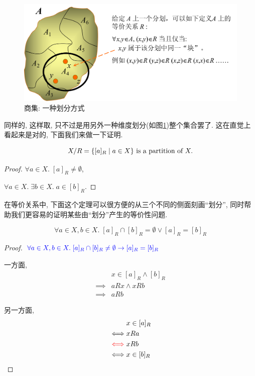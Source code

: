 \begin{figure}
	\centering
	\includegraphics[scale=0.6]{3-set-theory/figs/quot-set}
	\caption{商集: 一种划分方式}
	\label{figs:qset}
\end{figure}

同样的, 这样取, 只不过是用另外一种维度划分(如图\ref{figs:qset})整个集合罢了. 这在直觉上看起来是对的, 下面我们来做一下证明. 

\begin{theorem}
  \[
    X/R = \{[a]_{R} \mid a \in X\} \text{ is a partition of } X.
  \]
\end{theorem}

\begin{proof}
  $\forall a \in X.\; [a]_{R} \neq \emptyset$, 

  $\forall a \in X.\; \exists b \in X.\; a \in [b]_{R}$.
\end{proof}

在等价关系中, 下面这个定理可以很方便的从三个不同的侧面刻画``划分'', 同时帮助我们更容易的证明某些由``划分''产生的等价性问题. 

\begin{theorem}
  \[
      \forall a \in X, b \in X.\; [a]_{R} \cap [b]_{R} = \emptyset \lor [a]_{R} = [b]_{R}
  \]
\end{theorem}

\begin{proof}
  $\textcolor{blue}{\forall a \in X, b \in X.\; [a]_{R} \cap [b]_{R} \neq \emptyset \to [a]_{R} = [b]_{R}}$

  一方面, 
      \setcounter{equation}{0}
      \begin{align*}
        &x \in [a]_{R} \land [b]_{R} \\
        \implies& aRx \land xRb \\
        \implies& aRb
      \end{align*}

  另一方面, 
      \setcounter{equation}{0}
      \begin{align*}
        &x \in [a]_{R} \\
        \iff& x R a \\
        \textcolor{red}{\iff}& x R b \\
        \iff& x \in [b]_{R}
      \end{align*}
\end{proof}


